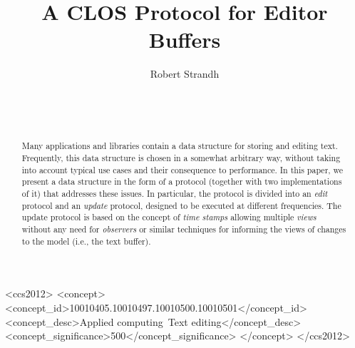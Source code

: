 \documentclass{sig-alternate-05-2015}
\def\inputtex#1{}
\begin{document}
\title{A CLOS Protocol for Editor Buffers}
\author{\alignauthor
Robert Strandh\\
\\
\\
\\
}


\maketitle

\begin{abstract}
Many applications and libraries contain a data structure for storing
and editing text.  Frequently, this data structure is chosen in a
somewhat arbitrary way, without taking into account typical use cases
and their consequence to performance.  In this paper, we present a
data structure in the form of a \clos{} protocol (together with two
implementations of it) that addresses these issues.  In particular,
the protocol is divided into an \emph{edit} protocol and an
\emph{update} protocol, designed to be executed at different
frequencies.  The update protocol is based on the concept of
\emph{time stamps} allowing multiple \emph{views} without any need for
\emph{observers} or similar techniques for informing the views of
changes to the model (i.e., the text buffer).
\end{abstract}

\begin{CCSXML}
  <ccs2012>
  <concept>
  <concept_id>10010405.10010497.10010500.10010501</concept_id>
  <concept_desc>Applied computing~Text editing</concept_desc>
  <concept_significance>500</concept_significance>
  </concept>
  </ccs2012>
\end{CCSXML}


\printccsdesc



\inputtex{spec-macros.tex}

\inputtex{sec-introduction.tex}
\inputtex{sec-previous.tex}
\inputtex{sec-our-method.tex}
\inputtex{sec-benefits.tex}
\inputtex{sec-conclusions.tex}
\inputtex{sec-acknowledgments.tex}
\inputtex{app-protocol.tex}



\end{document}
